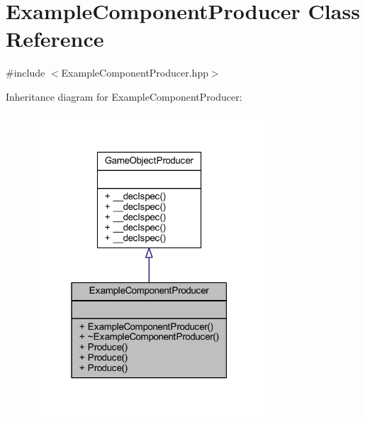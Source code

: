 \hypertarget{class_example_component_producer}{\section{Example\-Component\-Producer Class Reference}
\label{class_example_component_producer}
}


{\ttfamily \#include $<$Example\-Component\-Producer.\-hpp$>$}



Inheritance diagram for Example\-Component\-Producer\-:
\nopagebreak
\begin{figure}[H]
\begin{center}
\leavevmode
\includegraphics[width=244pt]{class_example_component_producer__inherit__graph}
\end{center}
\end{figure}


